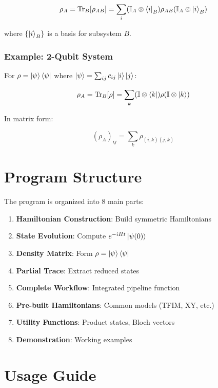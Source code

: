 \documentclass[11pt,a4paper]{article}
\begin{document}
\begin{equation}
    \rho_A = \text{Tr}_B[\rho_{AB}] = \sum_i (\mathbb{I}_A \otimes \bra{i}_B) \rho_{AB} (\mathbb{I}_A \otimes \ket{i}_B)
\end{equation}

where $\{\ket{i}_B\}$ is a basis for subsystem $B$.

\subsubsection{Example: 2-Qubit System}

For $\rho = \ket{\psi}\bra{\psi}$ where $\ket{\psi} = \sum_{ij} c_{ij}\ket{i}\ket{j}$:

\begin{equation}
    \rho_A = \text{Tr}_B[\rho] = \sum_k (\mathbb{I} \otimes \bra{k}) \rho (\mathbb{I} \otimes \ket{k})
\end{equation}

In matrix form:

\begin{equation}
    (\rho_A)_{ij} = \sum_k \rho_{(i,k)(j,k)}
\end{equation}

\section{Program Structure}

The program is organized into 8 main parts:

\begin{enumerate}
    \item \textbf{Hamiltonian Construction}: Build symmetric Hamiltonians
    \item \textbf{State Evolution}: Compute $e^{-iHt}\ket{\psi(0)}$
    \item \textbf{Density Matrix}: Form $\rho = \ket{\psi}\bra{\psi}$
    \item \textbf{Partial Trace}: Extract reduced states
    \item \textbf{Complete Workflow}: Integrated pipeline function
    \item \textbf{Pre-built Hamiltonians}: Common models (TFIM, XY, etc.)
    \item \textbf{Utility Functions}: Product states, Bloch vectors
    \item \textbf{Demonstration}: Working examples
\end{enumerate}

\section{Usage Guide}
\end{document}
